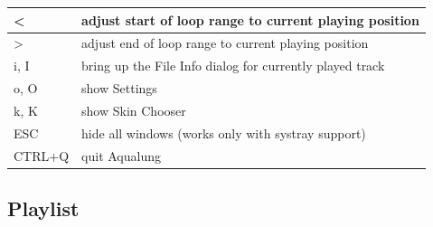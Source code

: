 \documentclass[10pt,english]{article}
\begin{document}
\begin{center}
\begin{tabular}{|m{4cm}|m{10cm}|}
<&
adjust start of loop range to current playing position
\\ \hline 

>&
adjust end of loop range to current playing position
\\ \hline 
\hline 

i, I&
bring up the File Info dialog for currently played track
\\ \hline 

o, O&
show Settings
\\ \hline 

k, K&
show Skin Chooser
\\ \hline 
\hline 

ESC&
hide all windows (works only with systray support)
\\ \hline 

CTRL+Q&
quit Aqualung
\\ \hline 
\end{tabular}\end{center}



\subsection{Playlist\label{idp1902240}}
\end{document}
